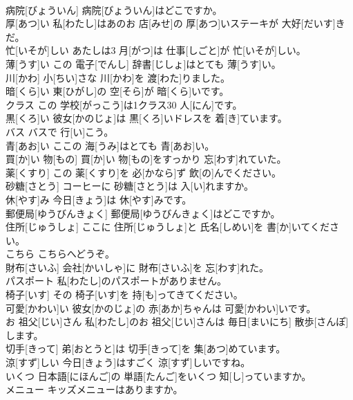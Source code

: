 \documentclass[8pt]{extreport}
\begin{document}
\begin{CJK}{UTF8}{min}
\\	病院[びょういん]	病院[びょういん]はどこですか。		
\\	厚[あつ]い	私[わたし]はあのお 店[みせ]の 厚[あつ]いステーキが 大好[だいす]きだ。		
\\	忙[いそが]しい	あたしは3 月[がつ]は 仕事[しごと]が 忙[いそが]しい。		
\\	薄[うす]い	この 電子[でんし] 辞書[じしょ]はとても 薄[うす]い。		
\\	川[かわ]	小[ちい]さな 川[かわ]を 渡[わた]りました。		
\\	暗[くら]い	東[ひがし]の 空[そら]が 暗[くら]いです。		
\\	クラス	この 学校[がっこう]は1クラス30 人[にん]です。		
\\	黒[くろ]い	彼女[かのじょ]は 黒[くろ]いドレスを 着[き]ています。		
\\	バス	バスで 行[い]こう。		
\\	青[あお]い	ここの 海[うみ]はとても 青[あお]い。		
\\	買[か]い 物[もの]	買[か]い 物[もの]をすっかり 忘[わす]れていた。		
\\	薬[くすり]	この 薬[くすり]を 必[かなら]ず 飲[の]んでください。		
\\	砂糖[さとう]	コーヒーに 砂糖[さとう]は 入[い]れますか。		
\\	休[やす]み	今日[きょう]は 休[やす]みです。		
\\	郵便局[ゆうびんきょく]	郵便局[ゆうびんきょく]はどこですか。		
\\	住所[じゅうしょ]	ここに 住所[じゅうしょ]と 氏名[しめい]を 書[か]いてください。		
\\	こちら	こちらへどうぞ。		
\\	財布[さいふ]	会社[かいしゃ]に 財布[さいふ]を 忘[わす]れた。		
\\	パスポート	私[わたし]のパスポートがありません。		
\\	椅子[いす]	その 椅子[いす]を 持[も]ってきてください。		
\\	可愛[かわい]い	彼女[かのじょ]の 赤[あか]ちゃんは 可愛[かわい]いです。		
\\	お 祖父[じい]さん	私[わたし]のお 祖父[じい]さんは 毎日[まいにち] 散歩[さんぽ]します。		
\\	切手[きって]	弟[おとうと]は 切手[きって]を 集[あつ]めています。		
\\	涼[すず]しい	今日[きょう]はすごく 涼[すず]しいですね。		
\\	いくつ	日本語[にほんご]の 単語[たんご]をいくつ 知[し]っていますか。		
\\	メニュー	キッズメニューはありますか。		

\end{CJK}
\end{document}

